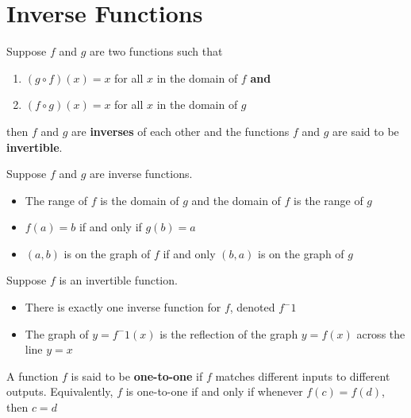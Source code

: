 \section{Inverse Functions}

\begin{definition}
    Suppose $f$ and $g$ are two functions such that
    \begin{enumerate}
        \item $(g \circ f)(x) = x$ for all $x$ in the domain of $f$ \textbf{and}
        \item $(f \circ g)(x) = x$ for all $x$ in the domain of $g$
    \end{enumerate}
    then $f$ and $g$ are \textbf{inverses} of each other and the functions $f$ and $g$ are said to be \textbf{invertible}.
\end{definition}

\begin{theorem}
    Suppose $f$ and $g$ are inverse functions.
    \begin{itemize}
        \item The range of $f$ is the domain of $g$ and the domain of $f$ is the range of $g$
        \item $f(a)= b$ if and only if $g(b) = a$
        \item $(a,b)$ is on the graph of $f$ if and only $(b,a)$ is on the graph of $g$
    \end{itemize}
\end{theorem}

\begin{theorem}
    Suppose $f$ is an invertible function.
    \begin{itemize}
        \item There is exactly one inverse function for $f$, denoted $f^-1$
        \item The graph of $y = f^-1(x)$ is the reflection of the graph $y=f(x)$ across the line $y=x$
    \end{itemize}
\end{theorem}

\begin{definition}
    A function $f$ is said to be \textbf{one-to-one} if $f$ matches different inputs to different outputs. Equivalently, $f$ is one-to-one if and only if whenever $f(c) = f(d)$, then $c=d$
\end{definition}

